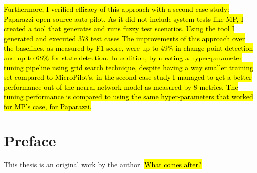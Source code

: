 \hl{Furthermore, I verified efficacy of this approach with a second case study: Paparazzi open source auto-pilot. As it did not include system tests like MP, I created a tool that generates and runs fuzzy test scenarios. Using the tool I generated and executed 378 test cases %
The improvements of this approach over the baselines, as measured by F1 score, were up to 49\% in change point detection and up to 68\% for state detection.
In addition, by creating a hyper-parameter tuning pipeline using grid search technique, despite having a way smaller training set compared to MicroPilot's, in the second case study I managed to get a better performance out of the neural network model as measured by 8 metrics. The tuning performance is compared to using the same hyper-parameters that worked for MP's case, for Paparazzi.}%




\chapter{Preface}

This thesis is an original work by the author. \hl{What comes after?}


